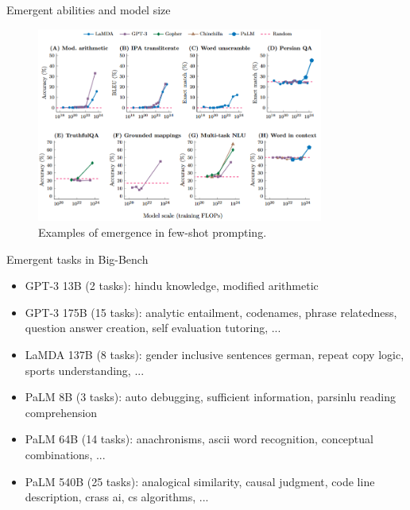 \begin{vbframe}{Emergent abilities and model size}

\vfill

\begin{figure}
    \centering
    \includegraphics[width=0.84\textwidth]{figure/emergent_abilities.png}
    \caption{Examples of emergence in few-shot prompting.}
    \label{fig:emergent_abilities}
\end{figure}

\vfill

\end{vbframe}


\begin{vbframe}{Emergent tasks in Big-Bench}

\vfill

\begin{itemize}
    \item GPT-3 13B (2 tasks): hindu knowledge, modified arithmetic
    \item GPT-3 175B (15 tasks): analytic entailment, codenames, phrase relatedness, question answer creation, self evaluation tutoring, ...
    \item LaMDA 137B (8 tasks): gender inclusive sentences german, repeat copy logic, sports understanding, ...
    \item PaLM 8B (3 tasks): auto debugging, sufficient information, parsinlu reading comprehension
    \item PaLM 64B (14 tasks): anachronisms, ascii word recognition, conceptual combinations, ...
    \item PaLM 540B (25 tasks): analogical similarity, causal judgment, code line description, crass ai, cs algorithms, ...
\end{itemize}

\vfill

\end{vbframe}

